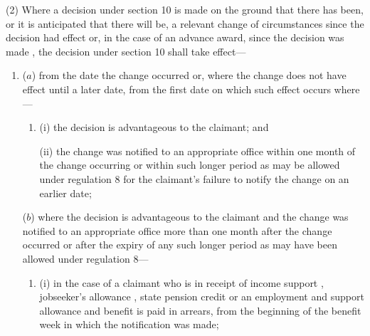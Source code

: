 \documentclass[12pt,a4paper]{article}
\begin{document}
(2) Where a decision under section 10 is made on the ground that there has been, or it is anticipated that there will be, a relevant change of circumstances since the decision 
had effect  %
or, in the case of an advance award, since the decision was made%
, the decision under section 10 shall take effect—
\begin{enumerate}\item[]
%

($a$) from the date the change occurred or, where the change does not have effect until a later date, from the first date on which such effect occurs where---
\begin{enumerate}\item[]
(i) the decision is advantageous to the claimant; and

(ii) the change was notified to an appropriate office within one month of the change occurring or within such longer period as may be allowed under regulation 8 for the claimant’s failure to notify the change on an earlier date;
\end{enumerate}

($b$) where the decision is advantageous to the claimant and the change was notified to an appropriate office more than one month after the change occurred or after the expiry of any such longer period as may have been allowed under regulation 8—
\begin{enumerate}\item[]
(i) in the case of a claimant who is in receipt of income support%
, jobseeker's allowance%
, state pension credit or an employment and support allowance  %
and benefit is paid in arrears, from the beginning of the benefit week in which the notification was made;


\end{enumerate}
\end{enumerate}
\end{document}
